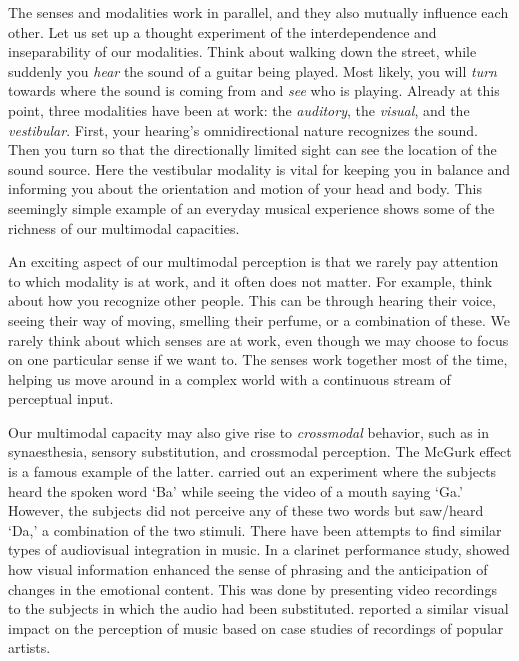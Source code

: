 The senses and modalities work in parallel, and they also mutually influence each other. Let us set up a thought experiment of the interdependence and inseparability of our modalities. Think about walking down the street, while suddenly you \emph{hear} the sound of a guitar being played. Most likely, you will \emph{turn} towards where the sound is coming from and \emph{see} who is playing. Already at this point, three modalities have been at work: the \emph{auditory}, the \emph{visual}, and the \emph{vestibular}. First, your hearing's omnidirectional nature recognizes the sound. Then you turn so that the directionally limited sight can see the location of the sound source. Here the vestibular modality is vital for keeping you in balance and informing you about the orientation and motion of your head and body. This seemingly simple example of an everyday musical experience shows some of the richness of our multimodal capacities.

An exciting aspect of our multimodal perception is that we rarely pay attention to which modality is at work, and it often does not matter. For example, think about how you recognize other people. This can be through hearing their voice, seeing their way of moving, smelling their perfume, or a combination of these. We rarely think about which senses are at work, even though we may choose to focus on one particular sense if we want to. The senses work together most of the time, helping us move around in a complex world with a continuous stream of perceptual input.

Our multimodal capacity may also give rise to \emph{crossmodal} behavior, such as in synaesthesia, sensory substitution, and crossmodal perception. The McGurk effect is a famous example of the latter. \citet{mcgurk_hearing_1976} carried out an experiment where the subjects heard the spoken word `Ba' while seeing the video of a mouth saying `Ga.' However, the subjects did not perceive any of these two words but saw/heard `Da,' a combination of the two stimuli. There have been attempts to find similar types of audiovisual integration in music. In a clarinet performance study, \citet{vines_cross-modal_2006} showed how visual information enhanced the sense of phrasing and the anticipation of changes in the emotional content. This was done by presenting video recordings to the subjects in which the audio had been substituted. \citet{thompson_seeing_2005} reported a similar visual impact on the perception of music based on case studies of recordings of popular artists.

